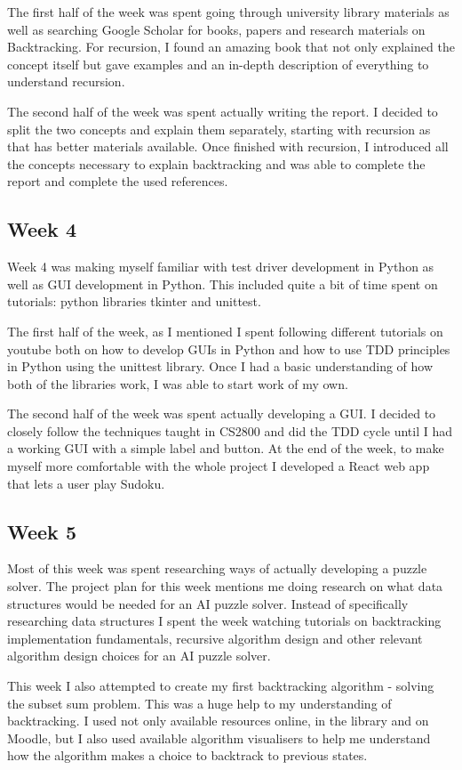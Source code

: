 \documentclass{article}
\begin{document}
The first half of the week was spent going through university library materials as well as searching Google Scholar for books, papers and research materials on Backtracking. For recursion, I found an amazing book that not only explained the concept itself but gave examples and an in-depth description of everything to understand recursion.

The second half of the week was spent actually writing the report. I decided to split the two concepts and explain them separately, starting with recursion as that has better materials available. Once finished with recursion, I introduced all the concepts necessary to explain backtracking and was able to complete the report and complete the used references.

\subsection{Week 4}
Week 4 was making myself familiar with test driver development in Python as well as GUI development in Python. This included quite a bit of time spent on tutorials: python libraries tkinter and unittest. 

The first half of the week, as I mentioned I spent following different tutorials on youtube both on how to develop GUIs in Python and how to use TDD principles in Python using the unittest library. Once I had a basic understanding of how both of the libraries work, I was able to start work of my own.

The second half of the week was spent actually developing a GUI. I decided to closely follow the techniques taught in CS2800 and did the TDD cycle until I had a working GUI with a simple label and button. At the end of the week, to make myself more comfortable with the whole project I developed a React web app that lets a user play Sudoku.

\subsection{Week 5}
Most of this week was spent researching ways of actually developing a puzzle solver. The project plan for this week mentions me doing research on what data structures would be needed for an AI puzzle solver. Instead of specifically researching data structures I spent the week watching tutorials on backtracking implementation fundamentals, recursive algorithm design and other relevant algorithm design choices for an AI puzzle solver. 

This week I also attempted to create my first backtracking algorithm - solving the subset sum problem. This was a huge help to my understanding of backtracking. I used not only available resources online, in the library and on Moodle, but I also used available algorithm visualisers to help me understand how the algorithm makes a choice to backtrack to previous states.
\end{document}
